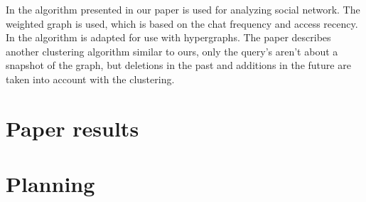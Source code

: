 \documentclass[a4paper,11pt]{article}
\begin{document}
In \cite{DynPar} the algorithm presented in our paper is used for analyzing social network. The weighted graph is used, which is based on the chat frequency and access recency. In \cite{StrHyp} the algorithm is adapted for use with hypergraphs. The paper \cite{ProStr} describes another clustering algorithm similar to ours, only the query's aren't about a snapshot of the graph, but deletions in the past and additions in the future are taken into account with the clustering.





\section{Paper results}


\section{Planning}
\end{document}
